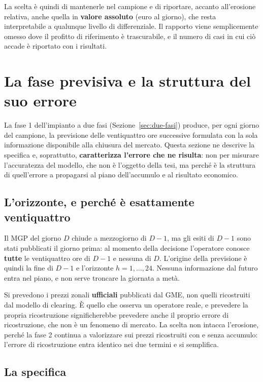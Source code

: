 La scelta \`e quindi di mantenerle nel campione e di riportare, accanto all'erosione
relativa, anche quella in \textbf{valore assoluto} (euro al giorno), che resta interpretabile
a qualunque livello di differenziale. Il rapporto viene semplicemente omesso dove il profitto
di riferimento \`e trascurabile, e il numero di casi in cui ci\`o accade \`e riportato con i
risultati.

\section{La fase previsiva e la struttura del suo errore}
\label{sec:previsione}

La fase 1 dell'impianto a due fasi (Sezione~\ref{sec:due-fasi}) produce, per ogni giorno del
campione, la previsione delle ventiquattro ore successive formulata con la sola informazione
disponibile alla chiusura del mercato. Questa sezione ne descrive la specifica e, soprattutto,
\textbf{caratterizza l'errore che ne risulta}: non per misurare l'accuratezza del modello, che
non \`e l'oggetto della tesi, ma perch\'e \`e la struttura di quell'errore a propagarsi al
piano dell'accumulo e al risultato economico.

\subsection{L'orizzonte, e perch\'e \`e esattamente ventiquattro}

Il \ac{MGP} del giorno $D$ chiude a mezzogiorno di $D-1$, ma gli esiti di $D-1$ sono stati
pubblicati il giorno prima: al momento della decisione l'operatore conosce \textbf{tutte} le
ventiquattro ore di $D-1$ e nessuna di $D$. L'origine della previsione \`e quindi la fine di
$D-1$ e l'orizzonte $h = 1, \dots, 24$. Nessuna informazione dal futuro entra nel piano, e non
serve troncare la giornata a met\`a.

Si prevedono i prezzi zonali \textbf{ufficiali} pubblicati dal \ac{GME}, non quelli
ricostruiti dal modello di clearing. \`E quello che osserva un operatore reale, e prevedere la
propria ricostruzione significherebbe prevedere anche il proprio errore di ricostruzione, che
non \`e un fenomeno di mercato. La scelta non intacca l'erosione, perch\'e la fase 2 continua
a valorizzare sui prezzi ricostruiti con e senza accumulo: l'errore di ricostruzione entra
identico nei due termini e si semplifica.

\subsection{La specifica}
\label{sec:specifica}

